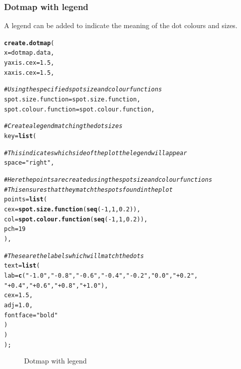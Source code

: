 \documentclass[letterpaper]{article}\usepackage[]{graphicx}\usepackage[]{color}
\makeatletter
\newcommand{\hlnum}[1]{\textcolor[rgb]{0.686,0.059,0.569}{#1}}%
\newcommand{\hlstr}[1]{\textcolor[rgb]{0.192,0.494,0.8}{#1}}%
\newcommand{\hlcom}[1]{\textcolor[rgb]{0.678,0.584,0.686}{\textit{#1}}}%
\newcommand{\hlopt}[1]{\textcolor[rgb]{0,0,0}{#1}}%
\newcommand{\hlstd}[1]{\textcolor[rgb]{0.345,0.345,0.345}{#1}}%
\newcommand{\hlkwc}[1]{\textcolor[rgb]{0.333,0.667,0.333}{#1}}%
\newcommand{\hlkwd}[1]{\textcolor[rgb]{0.737,0.353,0.396}{\textbf{#1}}}%
\newenvironment{kframe}{%
 \def\at@end@of@kframe{}%
 \ifinner\ifhmode%
  \def\at@end@of@kframe{\end{minipage}}%
  \begin{minipage}{\columnwidth}%
 \fi\fi%
 \def\FrameCommand##1{\hskip\@totalleftmargin \hskip-\fboxsep
 \colorbox{shadecolor}{##1}\hskip-\fboxsep
     \hskip-\linewidth \hskip-\@totalleftmargin \hskip\columnwidth}%
 \MakeFramed {\advance\hsize-\width
   \@totalleftmargin\z@ \linewidth\hsize
   \@setminipage}}%
 {\par\unskip\endMakeFramed%
 \at@end@of@kframe}
\newenvironment{knitrout}{}{} %
\makeatother
\begin{document}
\subsubsection{Dotmap with legend}
A legend can be added to indicate the meaning of the dot colours and sizes.

\begin{knitrout}
\color{fgcolor}\begin{kframe}
\begin{alltt}
\hlkwd{create.dotmap}\hlstd{(}
    \hlkwc{x} \hlstd{= dotmap.data,}
    \hlkwc{yaxis.cex} \hlstd{=} \hlnum{1.5}\hlstd{,}
    \hlkwc{xaxis.cex} \hlstd{=} \hlnum{1.5}\hlstd{,}

    \hlcom{# Using the specified spot size and colour functions}
    \hlkwc{spot.size.function} \hlstd{= spot.size.function,}
    \hlkwc{spot.colour.function} \hlstd{= spot.colour.function,}

    \hlcom{# Create a legend matching the dot sizes}
    \hlkwc{key} \hlstd{=} \hlkwd{list}\hlstd{(}

        \hlcom{# This indicates which side of the plot the legend will appear}
        \hlkwc{space} \hlstd{=} \hlstr{"right"}\hlstd{,}

        \hlcom{# Here the points are created using the spot size and colour functions}
        \hlcom{# This ensures that they match the spots found in the plot}
        \hlkwc{points} \hlstd{=} \hlkwd{list}\hlstd{(}
            \hlkwc{cex} \hlstd{=} \hlkwd{spot.size.function}\hlstd{(}\hlkwd{seq}\hlstd{(}\hlopt{-}\hlnum{1}\hlstd{,} \hlnum{1}\hlstd{,} \hlnum{0.2}\hlstd{)),}
            \hlkwc{col} \hlstd{=} \hlkwd{spot.colour.function}\hlstd{(}\hlkwd{seq}\hlstd{(}\hlopt{-}\hlnum{1}\hlstd{,} \hlnum{1}\hlstd{,} \hlnum{0.2}\hlstd{)),}
            \hlkwc{pch} \hlstd{=} \hlnum{19}
            \hlstd{),}

        \hlcom{# These are the labels which will match the dots}
        \hlkwc{text} \hlstd{=} \hlkwd{list}\hlstd{(}
            \hlkwc{lab} \hlstd{=} \hlkwd{c}\hlstd{(}\hlstr{"-1.0"}\hlstd{,} \hlstr{"-0.8"}\hlstd{,} \hlstr{"-0.6"}\hlstd{,} \hlstr{"-0.4"}\hlstd{,} \hlstr{"-0.2"}\hlstd{,} \hlstr{" 0.0"}\hlstd{,} \hlstr{"+0.2"}\hlstd{,}
                 \hlstr{"+0.4"}\hlstd{,} \hlstr{"+0.6"}\hlstd{,} \hlstr{"+0.8"}\hlstd{,} \hlstr{"+1.0"}\hlstd{),}
            \hlkwc{cex} \hlstd{=} \hlnum{1.5}\hlstd{,}
            \hlkwc{adj} \hlstd{=} \hlnum{1.0}\hlstd{,}
            \hlkwc{fontface} \hlstd{=} \hlstr{"bold"}
            \hlstd{)}
        \hlstd{)}
    \hlstd{);}
\end{alltt}
\end{kframe}\begin{figure}[]


{\centering {} 

}

\caption[Dotmap with legend]{Dotmap with legend\label{fig:dotmap2}}
\end{figure}


\end{knitrout}
\end{document}
